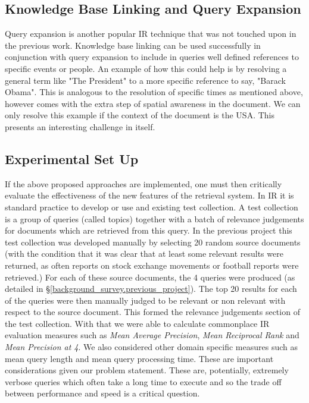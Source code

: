 \documentclass{mprop}
\begin{document}
\subsection{Knowledge Base Linking and Query Expansion}
Query expansion is another popular IR technique that was not touched upon in the previous work. Knowledge base linking can be used successfully in conjunction with query expansion to include in queries well defined references to specific events or people. An example of how this could help is by resolving a general term like "The President" to a more specific reference to say, "Barack Obama". This is analogous to the resolution of specific times as mentioned above, however comes with the extra step of spatial awareness in the document. We can only resolve this example if the context of the document is the USA. This presents an interesting challenge in itself.

\subsection{Experimental Set Up}
If the above proposed approaches are implemented, one must then critically evaluate the effectiveness of the new features of the retrieval system. In IR it is standard practice to develop or use and existing test collection. A test collection is a group of queries (called topics) together with a batch of relevance judgements for documents which are retrieved from this query. In the previous project this test collection was developed manually by selecting 20 random source documents (with the condition that it was clear that at least some relevant results were returned, as often reports on stock exchange movements or football reports were retrieved.) For each of these source documents, the 4 queries were produced (as detailed in \S \ref{background_survey.previous_project}). The top 20 results for each of the queries were then manually judged to be relevant or non relevant with respect to the source document. This formed the relevance judgements section of the test collection. With that we were able to calculate commonplace IR evaluation measures such as \textit{Mean Average Precision}, \textit{Mean Reciprocal Rank} and \textit{Mean Precision at 4}. We also considered other domain specific measures such as mean query length and mean query processing time. These are important considerations given our problem statement. These are, potentially, extremely verbose queries which often take a long time to execute and so the trade off between performance and speed is a critical question.
\end{document}
